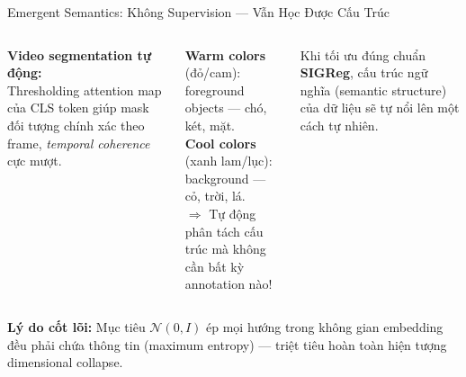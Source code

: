 \documentclass[aspectratio=169,9pt]{beamer}
\begin{document}
\begin{frame}{Emergent Semantics: Không Supervision — Vẫn Học Được Cấu Trúc}
\begin{columns}[T]
\vspace{0.8em}
\textbf{Video segmentation tự động:}\\[2pt]
Thresholding attention map của CLS token giúp mask đối tượng chính xác theo frame, \emph{temporal coherence} cực mượt.


\begin{goodbox}
\footnotesize \textbf{Warm colors} (đỏ/cam): foreground objects — chó, két, mặt.\\[5pt]
\textbf{Cool colors} (xanh lam/lục): background — cỏ, trời, lá.\\[5pt]
$\Rightarrow$ Tự động phân tách cấu trúc mà không cần bất kỳ annotation nào!
\end{goodbox}

\vspace{0.6em}
\begin{accentbox}
\footnotesize Khi tối ưu đúng chuẩn \textbf{SIGReg}, cấu trúc ngữ nghĩa (semantic structure) của dữ liệu sẽ tự nổi lên một cách tự nhiên.
\end{accentbox}

\end{columns}

\vspace{0.8em}
\begin{primarybox}
\footnotesize \textbf{Lý do cốt lõi:} Mục tiêu $\mathcal{N}(0,I)$ ép mọi hướng trong không gian embedding đều phải chứa thông tin (maximum entropy) — triệt tiêu hoàn toàn hiện tượng dimensional collapse.
\end{primarybox}
\end{frame}
\end{document}
